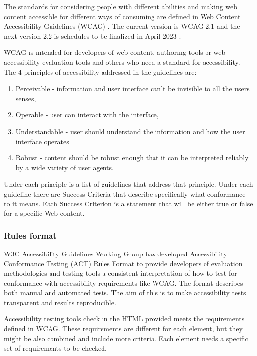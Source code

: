 \documentclass{master_thesis}
\begin{document}
The standards for considering people with different abilities and making web content accessible for different ways of consuming are defined in Web Content Accessibility Guidelines (WCAG) \citep{Kirkpatrick2018}. The current version is WCAG 2.1 and the next version 2.2 is schedules to be finalized in April 2023 \citep{Henry2023}.

WCAG is intended for developers of web content, authoring tools or web accessibility evaluation tools and others who need a standard for accessibility. The 4 principles of accessibility addressed in the guidelines are:
\begin{enumerate}
	\item Perceivable - information and user interface can't be invisible to all the users senses,
	\item Operable - user can interact with the interface,
	\item Understandable - user should understand the information and how the user interface operates
	\item Robust - content should be robust enough that it can be interpreted reliably by a wide variety of user agents.
\end{enumerate}
Under each principle is a list of guidelines that address that principle. Under each guideline there are Success Criteria that describe specifically what conformance to it means. Each Success Criterion is a statement that will be either true or false for a specific Web content.

\citep{AGWGP2022} 

\subsubsection{Rules format}

W3C Accessibility Guidelines Working Group has developed Accessibility Conformance Testing (ACT) Rules Format to provide developers of evaluation methodologies and testing tools a consistent interpretation of how to test for conformance with accessibility requirements like WCAG. The format describes both manual and automated tests. The aim of this is to make accessibility tests transparent and results reproducible. \citep{Fiers2019}

Accessibility testing tools check in the HTML provided meets the requirements defined in WCAG. These requirements are different for each element, but they might be also combined and include more criteria. Each element needs a specific set of requirements to be checked.
\end{document}
